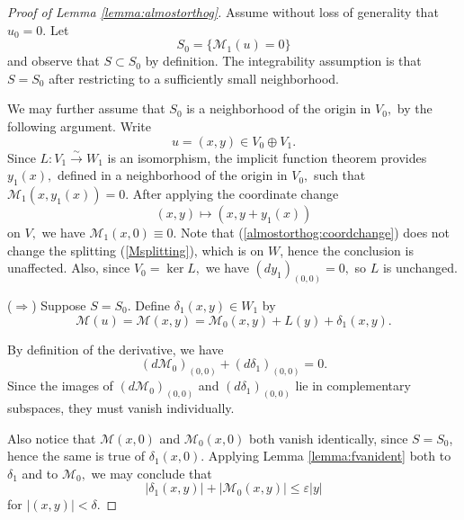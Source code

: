 \documentclass[12pt]{amsart}
\newcommand{\calM}{\mathcal{M}}
\renewcommand{\1}{{\mathbf 1}}
\newcommand{\eps}{{\varepsilon}}
\theoremstyle{others}
\numberwithin{equation}{section}
\begin{document}
\begin{proof}[Proof of Lemma \ref{lemma:almostorthog}] Assume without loss of generality that $u_0 = 0.$ %
Let 
$$S_0 = \{ \calM_1(u) = 0 \}$$
and observe that $S \subset S_0$ by definition. The integrability assumption is that $S = S_0$ after restricting to a sufficiently small neighborhood.



We may further assume that $S_0$ is a neighborhood of the origin in $V_0,$ by the following argument. Write
$$u = (x,y) \in V_0 \oplus V_1.$$
Since $L : V_1 \stackrel{\sim}{\to} W_1$ is an isomorphism, the implicit function theorem provides $y_1(x),$ defined in a neighborhood of the origin in $V_0,$ such that $\calM_1(x,y_1(x)) = 0.$ After applying the coordinate change
\begin{equation}\label{almostorthog:coordchange}
(x,y) \mapsto \left( x, y + y_1(x) \right)
\end{equation}
on $V,$ we have $\calM_1(x,0) \equiv 0.$ Note that (\ref{almostorthog:coordchange}) does not change the splitting (\ref{Msplitting}), which is on $W$,
hence the conclusion is unaffected. Also, since $V_0 = \ker L,$ we have $\left(d y_1 \right)_{(0,0)} = 0,$ so $L$ is unchanged. %



\vspace{2mm}

\noindent ($\Rightarrow$) Suppose $S = S_0.$ Define $\delta_1(x,y) \in W_1$ by 
    $$\calM(u) = \calM(x,y) = \calM_0(x,y) + L(y) + \delta_1(x,y).$$

    By definition of the derivative, we have
    $$\left(d \calM_0 \right)_{(0,0)} + \left( d \delta_1 \right)_{(0,0)} = 0.$$
    Since the images of $\left(d \calM_0 \right)_{(0,0)}$ and $\left( d \delta_1 \right)_{(0,0)}$ lie in complementary subspaces, they must vanish individually.
    
    Also notice that $\calM(x, 0)$ and $\calM_0(x,0)$ both vanish identically, since $S = S_0$, hence the same is true of $\delta_1(x,0).$
    Applying Lemma \ref{lemma:fvanident} both to $\delta_1$ and to $\calM_0,$ we may conclude that
    \begin{equation}\label{almostorthog:deltaM0eps}
    |\delta_1(x,y)| + |\calM_0(x,y)| \leq \eps |y|
    \end{equation}
    for $|(x,y)| < \delta.$
    

\end{proof}
\end{document}

